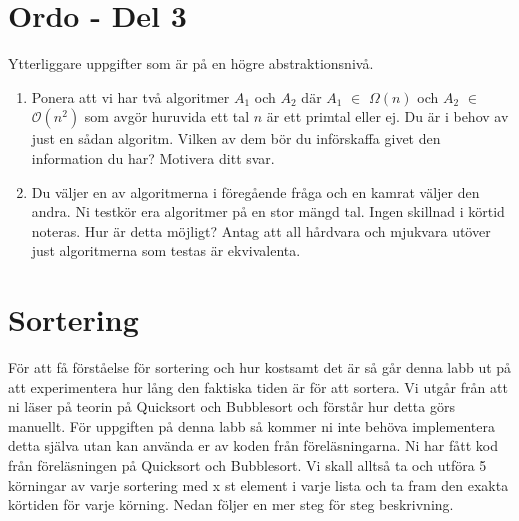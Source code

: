 \documentclass{article}
\begin{document}
   \section*{Ordo - Del 3
      }

  Ytterliggare uppgifter som är på en högre abstraktionsnivå.
  \begin{enumerate}
  
   
      \item Ponera att vi har två algoritmer $A_1$ och $A_2$ där  $A_1$ $\in$ $\Omega (n)$ och  $A_2$ $\in$ $\mathcal{O}(n^2)$ som avgör huruvida ett tal $n$ är ett primtal eller ej. Du är i behov av just en sådan algoritm. Vilken av dem bör du införskaffa givet den information du har? Motivera ditt svar.
	      
      \item Du väljer en av algoritmerna i föregående fråga och en kamrat väljer den andra. Ni
      testkör era algoritmer på en stor mängd tal. Ingen skillnad i körtid noteras. Hur är
      detta möjligt? Antag att all hårdvara och mjukvara utöver just algoritmerna som testas
      är ekvivalenta.
      
    \end{enumerate}
\section*{Sortering}
För att få förståelse för sortering och hur kostsamt det är så går denna labb ut på att experimentera hur lång den faktiska tiden är för att sortera. Vi utgår från att ni läser på teorin på Quicksort och Bubblesort och förstår hur detta görs manuellt. För uppgiften på denna labb så kommer ni inte behöva implementera detta själva utan kan använda er av koden från föreläsningarna. Ni har fått kod från föreläsningen på Quicksort och Bubblesort. Vi skall alltså ta och utföra 5 körningar av varje sortering med x st element i varje lista och ta fram den exakta körtiden för varje körning. Nedan följer en mer steg för steg beskrivning.
\end{document}
